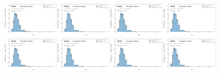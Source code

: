 \begin{figure}[h!]
\centering
\includegraphics[width=0.25\textwidth,page=1]{figures/SimResults/MultiFoldTotalErrors.pdf}\includegraphics[width=0.25\textwidth,page=2]{figures/SimResults/MultiFoldTotalErrors.pdf}\includegraphics[width=0.25\textwidth,page=3]{figures/SimResults/MultiFoldTotalErrors.pdf}\includegraphics[width=0.25\textwidth,page=4]{figures/SimResults/MultiFoldTotalErrors.pdf}\\
\includegraphics[width=0.25\textwidth,page=5]{figures/SimResults/MultiFoldTotalErrors.pdf}\includegraphics[width=0.25\textwidth,page=7]{figures/SimResults/MultiFoldTotalErrors.pdf}\includegraphics[width=0.25\textwidth,page=7]{figures/SimResults/MultiFoldTotalErrors.pdf}\includegraphics[width=0.25\textwidth,page=8]{figures/SimResults/MultiFoldTotalErrors.pdf}\\

\end{figure}
